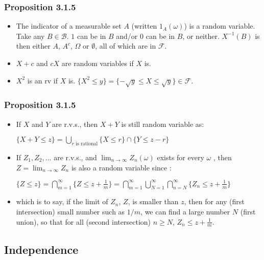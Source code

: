 \documentclass[handout]{beamer}
\begin{document}
\frame
{
  \frametitle{Proposition 3.1.5}

   \begin{itemize}

\item<1->  The indicator of a measurable set $A$ (written $1_A(\omega)$) is a random variable. Take any $B \in \mathcal{B}$. $1$ can be in $B$ and/or $0$ can be in $B$, or neither. $X^{-1}(B)$ is then either $A$, $A^c$, $\Omega$ or $\emptyset$, all of which are in $\mathcal{F}$.  

\item<2-> $X+c$ and $cX$ are random variables if $X$ is.

\item<3-> $X^2$ is an rv if $X$ is. $\{X^2 \le y\} = \{ - \sqrt{y} \le X \le \sqrt{y} \} \in \mathcal{F}$.
                                        
                 \end{itemize}
}

\frame
{
  \frametitle{Proposition 3.1.5}

   \begin{itemize}

    \item<1->  If $X$ and $Y$ are r.v.s., then $X+Y$ is still random variable as:
              
                  $\{X+Y\leq z\}=\bigcup_{r \text{ is rational}} \{X\leq r\} \cap \{Y\leq z-r\} $
                 \item<3->  If $Z_1, Z_2, \ldots$ are r.v.s., and $\lim_{n\rightarrow \infty} Z_n(\omega)$ exists for every $\omega$ , then $Z=\lim_{n\rightarrow \infty} Z_n$ is also a random variable since :
                 
$\{Z\leq z\} = \bigcap_{m=1}^{\infty} \{Z\leq z + \frac{1}{m} \}=\bigcap_{m=1}^{\infty} \bigcup_{N=1}^{\infty} \bigcap_{n=N}^{\infty} \{Z_n\leq z+\frac{1}{m}\}$
                                  
                  \item<3->[-]  which is to say, if the limit of $Z_n$, $Z$, is smaller than $z$, then for any (first intersection) small number such as $1/m$, we can find a large number $N$ (first union), so that for all (second intersection) $n\geq N$, $Z_n\leq z+\frac{1}{m}$. 
                  
                                        
                 \end{itemize}
}


\subsection{Independence}
\end{document}
